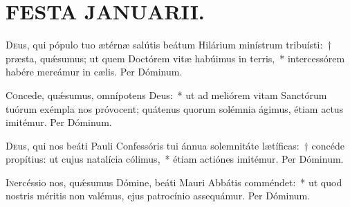 \documentclass[vesperale_romanum.tex]{subfiles}
\begin{document}
\section[Festa Januarii]{FESTA JANUARII.}


\duplexmtv


\oratio

\lettrine{D}{e}us, qui pópulo tuo ætérnæ salútis beátum Hilárium minístrum tribuísti:~† præsta, quǽsumus; ut quem Doctórem vitæ habúimus in terris,~* intercessórem habére mereámur in cælis.
Per Dóminum.


\oratio

\lettrine{C}{o}ncede, quǽsumus, omnípotens Deus:~* ut ad meliórem vitam Sanctórum tuórum exémpla nos próvocent; quátenus quorum solémnia ágimus, étiam actus imitémur.
Per Dóminum.

\myrule


\duplexmtv

\oratio

\lettrine{D}{e}us, qui nos beáti Pauli Confessóris tui ánnua solemnitáte lætíficas:~† concéde propítius: ut cujus natalícia cólimus,~* étiam actiónes imitémur. Per Dóminum.




\oratio

\lettrine{I}{n}ercéssio nos, quǽsumus Dómine, beáti Mauri Abbátis comméndet:~* ut quod nostris méritis non valémus, ejus patrocínio assequámur.
Per Dóminum.
\end{document}
